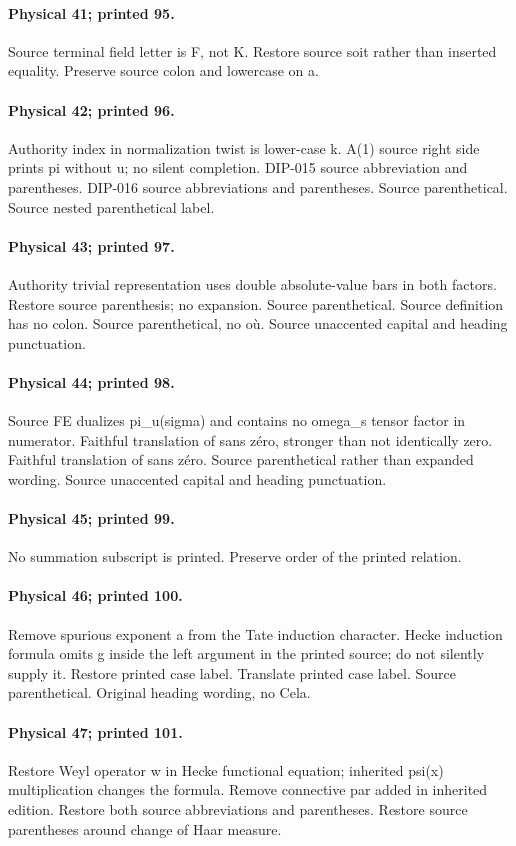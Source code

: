 \documentclass[10pt,a4paper]{article}
\begin{document}
\paragraph{Physical 41; printed 95.} Source terminal field letter is F, not K. Restore source soit rather than inserted equality. Preserve source colon and lowercase on a.
\paragraph{Physical 42; printed 96.} Authority index in normalization twist is lower-case k. A(1) source right side prints pi without u; no silent completion. DIP-015 source abbreviation and parentheses. DIP-016 source abbreviations and parentheses. Source parenthetical. Source nested parenthetical label.
\paragraph{Physical 43; printed 97.} Authority trivial representation uses double absolute-value bars in both factors. Restore source parenthesis; no expansion. Source parenthetical. Source definition has no colon. Source parenthetical, no où. Source unaccented capital and heading punctuation.
\paragraph{Physical 44; printed 98.} Source FE dualizes pi\_u(sigma) and contains no omega\_s tensor factor in numerator. Faithful translation of sans zéro, stronger than not identically zero. Faithful translation of sans zéro. Source parenthetical rather than expanded wording. Source unaccented capital and heading punctuation.
\paragraph{Physical 45; printed 99.} No summation subscript is printed. Preserve order of the printed relation.
\paragraph{Physical 46; printed 100.} Remove spurious exponent a from the Tate induction character. Hecke induction formula omits g inside the left argument in the printed source; do not silently supply it. Restore printed case label. Translate printed case label. Source parenthetical. Original heading wording, no Cela.
\paragraph{Physical 47; printed 101.} Restore Weyl operator w in Hecke functional equation; inherited psi(x) multiplication changes the formula. Remove connective par added in inherited edition. Restore both source abbreviations and parentheses. Restore source parentheses around change of Haar measure.
\end{document}
